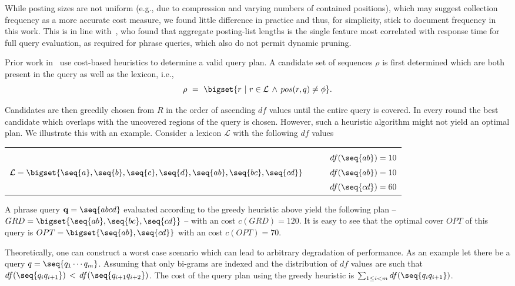 While posting sizes are not uniform (e.g., due to compression and
varying numbers of contained positions), which may suggest collection
frequency as a more accurate cost measure, we found little difference
in practice and thus, for simplicity, stick to document frequency in
this work. This is in line with~\cite{macdonald2012learning}, who found that aggregate posting-list lengths is the single feature most correlated with response time for full query evaluation, as required for phrase queries, which also do not permit dynamic pruning.

Prior work in~\cite{Transier:2008kx,Williams:2004fk} use cost-based heuristics to determine a valid query plan. A candidate set of sequences $\rho$ is first determined which are both present in the query as well as the lexicon, i.e.,
$$
 \rho ~=~ \bigset{ r ~|~ r \in \mathcal{L} \,\wedge\, pos(r,q) \neq \phi}.
$$

Candidates are then greedily chosen from $R$ in the order of ascending $df$ values until the entire query is covered. In every round the best candidate which overlaps with the uncovered regions of the query is chosen. However, such a heuristic algorithm might not yield an optimal plan. We illustrate this with an example. Consider a lexicon $\mathcal{L}$ with the following $df$ values

\begin{tabular}{l|r}
   &\\
   &~~ $df(\seq{a b}) = 10$ \\
  $\mathcal{L} = \bigset{ \seq{a},\seq{b},\seq{c},\seq{d}, \seq{a b}, \seq{b c}, \seq{c d}}$ ~&~~ $df(\seq{a b}) = 10$\\
   &~~ $df(\seq{c d}) = 60$\\
   \end{tabular}
$$
$$
A phrase query $\mathbf{q} = \seq{a b c d}$ evaluated according to the greedy heuristic above yield the following plan -- $GRD = \bigset{\seq{a b}, \seq{b c}, \seq{c d}}$ -- with an cost $c(GRD) = 120$. It is easy to see that the optimal cover $OPT$ of this query is $OPT = \bigset{\seq{a b}, \seq{c d}}$ with an cost $c(OPT) = 70$. 

Theoretically, one can construct a worst case scenario which can lead to arbitrary degradation of performance. As an example let there be a query $q = \seq{q_1 \cdots q_m}$. Assuming that only bi-grams are indexed and the distribution of $df$ values are such that $df(\seq{q_i q_{i+1}}) \,<\, df(\seq{q_{i+1} q_{i+2}})$. The cost of the query plan using the greedy heuristic is $\sum_{1 \leq i < m}df(\seq{q_i q_{i+1}})$.


